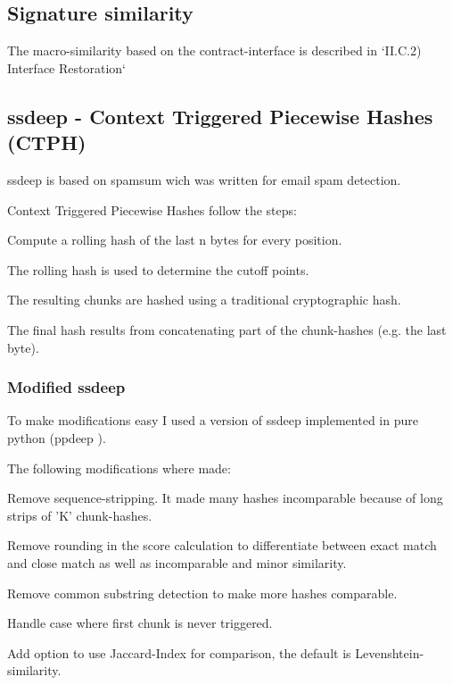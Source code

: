 \documentclass[../main.tex]{subfiles}
\begin{document}

\subsection{Signature similarity}

The macro-similarity based on the contract-interface is described in `II.C.2) Interface Restoration` 

\subsection{ssdeep - Context Triggered Piecewise Hashes (CTPH)}
ssdeep is based on spamsum\cite{spamsum} wich was written for email spam detection.

Context Triggered Piecewise Hashes follow the steps:
\begin{ol}
  \item Compute a rolling hash of the last n bytes for every position.
  \item The rolling hash is used to determine the cutoff points.
  \item The resulting chunks are hashed using a traditional cryptographic hash.
  \item The final hash results from concatenating part of the chunk-hashes (e.g. the last byte).
\end{ol}

\subsubsection{Modified ssdeep}
To make modifications easy I used a version of ssdeep implemented in pure python (ppdeep \cite{ppdeep}).

The following modifications where made:
\begin{ul}
  \item Remove sequence-stripping. It made many hashes incomparable because of long strips of 'K' chunk-hashes.
  \item Remove rounding in the score calculation to differentiate between exact match and close match as well as incomparable and minor similarity.
  \item Remove common substring detection to make more hashes comparable.
  \item Handle case where first chunk is never triggered.
  \item Add option to use Jaccard-Index for comparison, the default is Levenshtein-similarity.
\end{ul}
\end{document}
